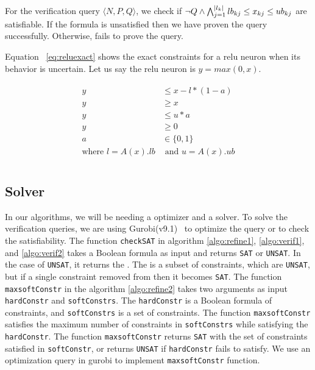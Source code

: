 For the verification query $\langle N, P, Q \rangle$, we check if
$\lnot Q \land \bigwedge_{j=1}^{|l_k|}lb_{kj} \leq x_{kj} \leq ub_{kj}$
are satisfiable.
%
If the formula is unsatisfied then we have proven the query successfully.
Otherwise, \deeppoly fails to prove the query.


Equation ~\ref{eq:reluexact} shows the exact constraints
for a relu neuron when its behavior is uncertain. Let us say the relu neuron is $y = max(0,x)$. 

\begin{align}
    \label{eq:reluexact}
    \begin{split}
        y &\leq x - l*(1-a) \\
        y &\geq x \\
        y &\leq u*a \\
        y &\geq 0 \\
        a &\in \{0,1\} \\ 
        \text{where }l = A(x).lb &\text{ and }u = A(x).ub \\
    \end{split}
\end{align}


\subsection{Solver}
\label{sec:solver}

In our algorithms, we will be needing a optimizer and a solver.
To solve the verification queries,
we are using Gurobi(v9.1)~\cite{gurobioptimizer} to optimize the query or to check the satisfiability. 
The function \texttt{checkSAT} in algorithm \ref{algo:refine1}, \ref{algo:verif1}, and
\ref{algo:verif2} 
takes a Boolean formula as input and returns \texttt{SAT} or \texttt{UNSAT}. 
In the case of \texttt{UNSAT}, it returns the \unsatcore{}. 
The \unsatcore{} is a subset of constraints, which are \texttt{UNSAT}, 
but if a single constraint removed from \unsatcore{} then it becomes \texttt{SAT}.
The function \texttt{maxsoftConstr} in the algorithm \ref{algo:refine2} takes
two arguments as input \texttt{hardConstr} and \texttt{softConstrs}. 
The \texttt{hardConstr} is a Boolean formula of constraints,
and \texttt{softConstrs} is a set of constraints. 
The function \texttt{maxsoftConstr} satisfies the maximum number of constraints
in \texttt{softConstrs} while satisfying the \texttt{hardConstr}. 
The function \texttt{maxsoftConstr} returns \texttt{SAT} with the set of
constraints satisfied in \texttt{softConstr}, or returns
\texttt{UNSAT} if \texttt{hardConstr} fails to satisfy.
We use an optimization query in gurobi to implement \texttt{maxsoftConstr} function.



